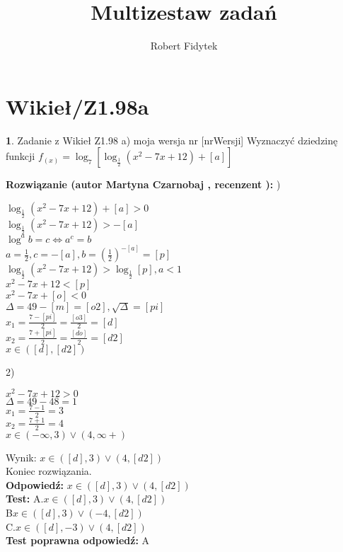 \documentclass[12pt, a4paper]{article}
\title{Multizestaw zadań}
\author{Robert Fidytek}
\date{}
\theoremstyle{definition} %
\newtheorem{zad}{}
\newcommand{\kategoria}[1]{\section{#1}} %
\newcommand{\zadStart}[1]{\begin{zad}#1\newline} %
\newcommand{\zadStop}{\end{zad}}   %
\newcommand{\rozwStart}[2]{\noindent \textbf{Rozwiązanie (autor #1 , recenzent #2): }\newline} %
\newcommand{\rozwStop}{\newline}                                            %
\newcommand{\odpStart}{\noindent \textbf{Odpowiedź:}\newline}    %
\newcommand{\odpStop}{\newline}                                             %
\newcommand{\testStart}{\noindent \textbf{Test:}\newline} %
\newcommand{\testStop}{\newline} %
\newcommand{\kluczStart}{\noindent \textbf{Test poprawna odpowiedź:}\newline} %
\newcommand{\kluczStop}{\newline} %
\begin{document}
\maketitle


\kategoria{Wikieł/Z1.98a}
\zadStart{Zadanie z Wikieł Z1.98 a) moja wersja nr [nrWersji]}
Wyznaczyć dziedzinę funkcji $ f_{(x)} = \log_{7}[\log_{\frac{1}{2}} (x^{2} - 7x + 12) + [a]] $\\
\zadStop
\rozwStart{Martyna Czarnobaj}{}
1)
\begin{center}
	$ \log_{\frac{1}{2}} (x^{2} - 7x + 12) + [a] > 0 $\\
	$ \log_{\frac{1}{2}} (x^{2} - 7x + 12) > -[a] $\\
	$ \log^{a} b = c \Leftrightarrow a^{c} = b $\\
	$ a = \frac{1}{2}, c = -[a], b = (\frac{1}{2})^{-[a]} = [p] $\\
	$ \log_{\frac{1}{2}} (x^{2} - 7x + 12) > \log_{\frac{1}{2}} [p], a < 1 $\\
	$ x^{2} - 7x + 12 < [p] $\\
	$ x^{2} - 7x + [o] < 0 $\\
	$ \Delta = 49 - [m] = [o2], \sqrt{\Delta}=[pi] $\\
	$ x_{1} = \frac{7 - [pi]}{2} = \frac{[o3]}{2} = [d] $\\
	$ x_{2} = \frac{7 + [pi]}{2} = \frac{[do]}{2} = [d2]  $\\
	$ x \in ([d],[d2]) $\\
\end{center}
2)
\begin{center}
	$ x^{2} - 7x + 12 > 0 $\\
	$ \Delta = 49 - 48 = 1 $\\
	$ x_{1} = \frac{7 - 1}{2} = 3 $\\
	$ x_{2} = \frac{7 + 1}{2} = 4 $\\
	$ x \in (- \infty, 3) \vee (4, \infty +) $\\
	
\end{center}
Wynik: $ x \in ([d],3) \vee (4,[d2]) $\\
Koniec rozwiązania.\\
\rozwStop
\odpStart
$ x \in ([d],3) \vee (4,[d2]) $\\
\odpStop
\testStart
A.$ x \in ([d],3) \vee (4,[d2]) $\\
B$ x \in ([d],3) \vee (-4,[d2]) $\\
C.$ x \in ([d],-3) \vee (4,[d2]) $\\
\testStop
\kluczStart
A
\kluczStop
\end{document}
